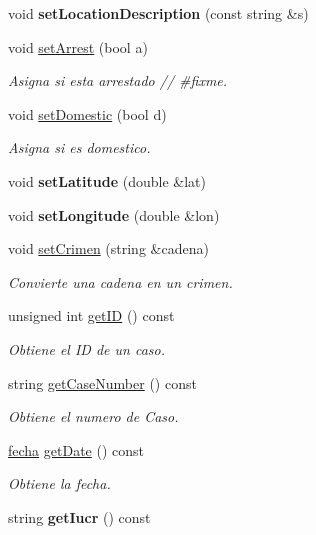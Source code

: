 \begin{DoxyCompactItemize}
\item 
\hypertarget{classcrimen_ad3bd97ed5867e3961a77f64a15797e41}{}void {\bfseries set\+Location\+Description} (const string \&s)\label{classcrimen_ad3bd97ed5867e3961a77f64a15797e41}

\item 
void \hyperlink{classcrimen_ae08b85470038469179a01ba753b7641a}{set\+Arrest} (bool a)
\begin{DoxyCompactList}\small\item\em Asigna si esta arrestado // \#fixme. \end{DoxyCompactList}\item 
void \hyperlink{classcrimen_a3ec14cf4bb0464350d8efd98d2679d41}{set\+Domestic} (bool d)
\begin{DoxyCompactList}\small\item\em Asigna si es domestico. \end{DoxyCompactList}\item 
\hypertarget{classcrimen_a10b0917bbef15352657a1ccdbee1a738}{}void {\bfseries set\+Latitude} (double \&lat)\label{classcrimen_a10b0917bbef15352657a1ccdbee1a738}

\item 
\hypertarget{classcrimen_a8db952f20e2fb3ab6a9124f0a6dcf0a4}{}void {\bfseries set\+Longitude} (double \&lon)\label{classcrimen_a8db952f20e2fb3ab6a9124f0a6dcf0a4}

\item 
void \hyperlink{classcrimen_a24c7850a61d6435929450b7b10964f07}{set\+Crimen} (string \&cadena)
\begin{DoxyCompactList}\small\item\em Convierte una cadena en un crimen. \end{DoxyCompactList}\item 
unsigned int \hyperlink{classcrimen_abc39a10bdf42cbc38f51872cbf02c69d}{get\+I\+D} () const 
\begin{DoxyCompactList}\small\item\em Obtiene el I\+D de un caso. \end{DoxyCompactList}\item 
string \hyperlink{classcrimen_ab3c025eb20cdcea9192ee190fa2af015}{get\+Case\+Number} () const 
\begin{DoxyCompactList}\small\item\em Obtiene el numero de Caso. \end{DoxyCompactList}\item 
\hyperlink{classfecha}{fecha} \hyperlink{classcrimen_a8a6712e536211034819441ab87e1c215}{get\+Date} () const 
\begin{DoxyCompactList}\small\item\em Obtiene la fecha. \end{DoxyCompactList}\item 
\hypertarget{classcrimen_a6d2bac20ef41f8c9944ca7deb8cc2ed5}{}string {\bfseries get\+Iucr} () const \label{classcrimen_a6d2bac20ef41f8c9944ca7deb8cc2ed5}


\end{DoxyCompactItemize}
